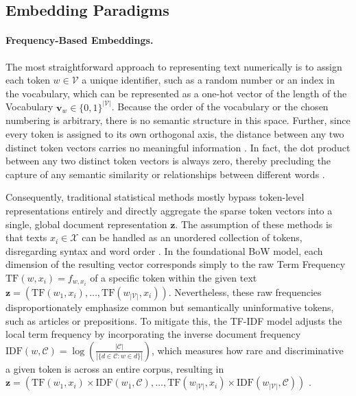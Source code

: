 \subsection{Embedding Paradigms}
\label{sec:emb_para}


\paragraph{Frequency-Based Embeddings.}

The most straightforward approach to representing text numerically is to assign each token $w \in \mathcal{V}$ a unique identifier, such as a random number or an index in the vocabulary, which can be represented as a one-hot vector of the length of the Vocabulary $\mathbf{v}_w \in \{0,1\}^{|\mathcal{V}|}$. Because the order of the vocabulary or the chosen numbering is arbitrary, there is no semantic structure in this space. Further, since every token is assigned to its own orthogonal axis, the distance between any two distinct token vectors carries no meaningful information \cite[p. 374 f.]{Bishop2024}. In fact, the dot product between any two distinct token vectors is always zero, thereby precluding the capture of any semantic similarity or relationships between different words \cite[p. 22 f.]{Goldberg2017}.

Consequently, traditional statistical methods mostly bypass token-level representations entirely and directly aggregate the sparse token vectors into a single, global document representation $\mathbf{z}$. The assumption of these methods is that texts $x_i \in \mathcal{X}$ can be handled as an unordered collection of tokens, disregarding syntax and word order \cite[p. 378]{Bishop2024}\cite[p. 11]{Sebastiani2002}. In the foundational \ac{BoW} model, each dimension of the resulting vector corresponds simply to the raw Term Frequency $\text{TF}(w, x_i) = f_{w,x_i}$ of a specific token within the given text $\mathbf{z} = (\text{TF}(w_1, x_i), \dots, \text{TF}(w_{|\mathcal{V}|}, x_i))$. Nevertheless, these raw frequencies disproportionately emphasize common but semantically uninformative tokens, such as articles or prepositions. To mitigate this, the \ac{TF-IDF} model adjusts the local term frequency by incorporating the inverse document frequency $\text{IDF}(w, \mathcal{C}) = \log \left( \frac{|\mathcal{C}|}{|\{d \in \mathcal{C} : w \in d\}|} \right)$, which measures how rare and discriminative a given token is across an entire corpus, resulting in $\mathbf{z} = (\text{TF}(w_1, x_i) \times \text{IDF}(w_1, \mathcal{C}), \dots, \text{TF}(w_{|\mathcal{V}|}, x_i) \times \text{IDF}(w_{|\mathcal{V}|}, \mathcal{C}))$  \cite[p.~101~f.]{Jurafsky2024_SLP}\cite[p. 117 f.]{manning2008introduction}\cite[p. 23 f., p. 69]{Goldberg2017}\cite{Sebastiani2002,Salton_AVS_1975}.


